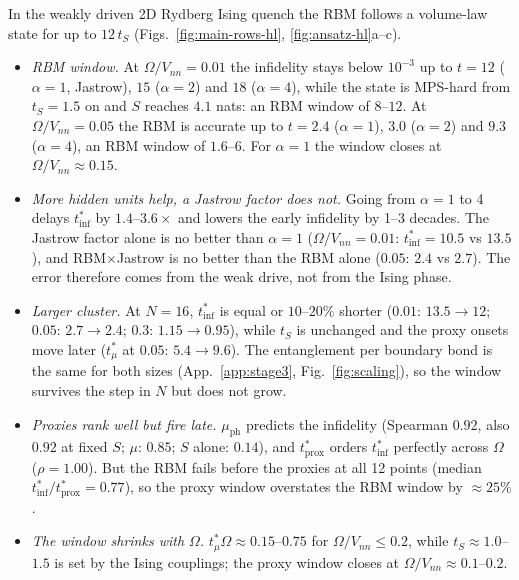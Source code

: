 \documentclass[11pt,a4paper]{article}
\newcommand{\tmu}{t^*_\mu}
\newcommand{\tinf}{t^*_{\mathrm{inf}}}
\newcommand{\tprox}{t^*_{\mathrm{prox}}}
\begin{document}
In the weakly driven 2D Rydberg Ising quench the RBM follows a volume-law state for up to $12\,t_S$
(Figs.~\ref{fig:main-rows-hl}, \ref{fig:ansatz-hl}a--c).
\begin{itemize}
  \item \emph{RBM window.} At $\Omega/V_{nn}=0.01$ the infidelity stays below $10^{-3}$ up to $t=12$ ($\alpha=1$,
    Jastrow), $15$ ($\alpha=2$) and $18$ ($\alpha=4$), while the state is MPS-hard from $t_S=1.5$ on and $S$ reaches
    $4.1$ nats: an RBM window of $8$--$12$. At $\Omega/V_{nn}=0.05$ the RBM is accurate up to $t=2.4$ ($\alpha=1$), $3.0$
    ($\alpha=2$) and $9.3$ ($\alpha=4$), an RBM window of $1.6$--$6$. For $\alpha=1$ the window closes at
    $\Omega/V_{nn}\approx0.15$.
  \item \emph{More hidden units help, a Jastrow factor does not.} Going from $\alpha=1$ to 4 delays $\tinf$ by
    $1.4$--$3.6\times$ and lowers the early infidelity by 1--3 decades. The Jastrow factor alone is no better than
    $\alpha=1$ ($\Omega/V_{nn}=0.01$: $\tinf=10.5$ vs $13.5$), and RBM$\times$Jastrow is no better than the RBM alone
    ($0.05$: $2.4$ vs $2.7$). The error therefore comes from the weak drive, not from the Ising phase.
  \item \emph{Larger cluster.} At $N=16$, $\tinf$ is equal or $10$--$20\%$ shorter ($0.01$: $13.5\to12$; $0.05$:
    $2.7\to2.4$; $0.3$: $1.15\to0.95$), while $t_S$ is unchanged and the proxy onsets move later ($\tmu$ at $0.05$:
    $5.4\to9.6$). The entanglement per boundary bond is the same for both sizes (App.~\ref{app:stage3},
    Fig.~\ref{fig:scaling}), so the window survives the step in $N$ but does not grow.
  \item \emph{Proxies rank well but fire late.} $\mu_{\mathrm{ph}}$ predicts the infidelity (Spearman $0.92$, also
    $0.92$ at fixed $S$; $\mu$: $0.85$; $S$ alone: $0.14$), and $\tprox$ orders $\tinf$ perfectly across $\Omega$
    ($\rho=1.00$). But the RBM fails before the proxies at all 12 points (median $\tinf/\tprox=0.77$), so the proxy
    window overstates the RBM window by $\approx25\%$.
  \item \emph{The window shrinks with $\Omega$.} $\tmu\Omega\approx0.15$--$0.75$ for $\Omega/V_{nn}\le0.2$, while
    $t_S\approx1.0$--$1.5$ is set by the Ising couplings; the proxy window closes at $\Omega/V_{nn}\approx0.1$--$0.2$.
\end{itemize}
\end{document}
